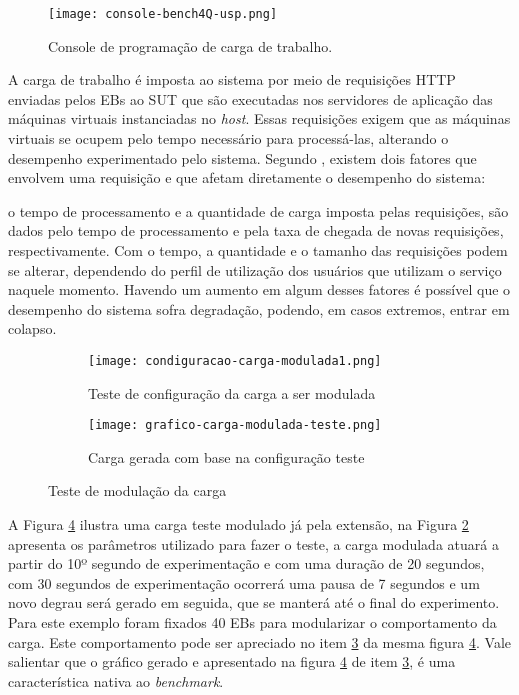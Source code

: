 \begin{figure}[!htb]
	\centering
	\texttt{[image: console-bench4Q-usp.png]}
	\caption{Console de programação de carga de trabalho.}
	\label{fig:interface-criada-beanch4q}
	\fautor
\end{figure}

A carga de trabalho é imposta ao sistema por meio de requisições HTTP enviadas pelos EBs ao SUT que são executadas nos servidores de aplicação das máquinas virtuais instanciadas no \textit{host}. Essas requisições exigem que as máquinas virtuais se ocupem pelo tempo necessário para processá-las, alterando o desempenho experimentado pelo sistema.
Segundo , existem dois fatores que envolvem uma requisição e que afetam diretamente o desempenho do sistema:
\begin{citacao}
	o tempo de processamento e a quantidade de carga imposta pelas requisições, são dados pelo tempo de processamento e pela taxa de chegada de novas requisições, respectivamente. Com o tempo, a quantidade e o tamanho das requisições podem se alterar, dependendo do perfil de utilização dos usuários que utilizam o serviço naquele momento. Havendo um aumento em algum desses fatores é possível que o desempenho do sistema sofra degradação, podendo, em casos extremos, entrar em colapso.
\end{citacao}

\begin{figure}[!htb]
	\centering
	\begin{subfigure}{\linewidth}
		\centering
		\texttt{[image: condiguracao-carga-modulada1.png]}
		\caption{Teste de configuração da carga a ser modulada}
		\label{fig:configuracao-carga-modulada-teste}
	\end{subfigure}
	
	\begin{subfigure}{\linewidth}
		\centering
		\texttt{[image: grafico-carga-modulada-teste.png]}
		\caption{Carga gerada com base na configuração teste}
		\label{fig:grafico-carga-modulada-teste}
	\end{subfigure}  
	\caption{Teste de modulação da carga}  
	\label{fig:carga-modulada-teste}
	\fautor
\end{figure}  

A Figura \ref{fig:carga-modulada-teste} ilustra uma carga teste modulado já pela extensão, na Figura \ref{fig:configuracao-carga-modulada-teste} apresenta os parâmetros utilizado para fazer o teste, a carga modulada atuará a partir do 10º segundo de experimentação e com uma duração de 20 segundos, com 30 segundos de experimentação ocorrerá uma pausa de 7 segundos e um novo degrau será gerado em seguida, que se manterá até o final do experimento. Para este exemplo foram fixados 40 EBs para modularizar o comportamento da carga. Este comportamento pode ser apreciado no item \ref{fig:grafico-carga-modulada-teste} da mesma figura \ref{fig:carga-modulada-teste}. Vale salientar que o gráfico gerado e apresentado na figura \ref{fig:carga-modulada-teste} de item \ref{fig:grafico-carga-modulada-teste}, é uma característica nativa ao \textit{benchmark}.

